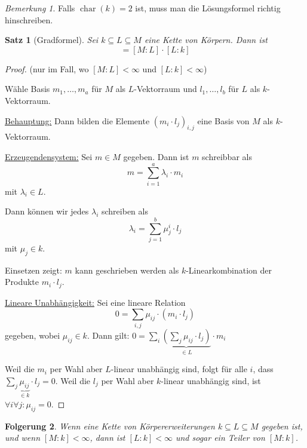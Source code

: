 \documentclass[a4paper,12pt,numbers=noenddot,parskip=full]{scrartcl}
\newcommand{\heading}{\underline}
\DeclareMathOperator{\charac}{char}
\theoremstyle{dotless}
\newtheorem{theorem}{Satz}[section]
\newtheorem{corollary}[theorem]{Folgerung}
\theoremstyle{remark}
\newtheorem*{remark}{Bemerkung}
\begin{document}
	\begin{remark}
		Falls $\charac(k) = 2$ ist, muss man die Lösungsformel richtig hinschreiben.
	\end{remark}

	\begin{theorem}[Gradformel]
		Sei $k \subseteq L \subseteq M$ eine Kette von Körpern. Dann ist
		\begin{equation*}
			[M:k] = [M:L] \cdot [L:k]
		\end{equation*}
	\end{theorem}

	\begin{proof}(nur im Fall, wo $[M:L] < \infty$ und $[L:k] < \infty$)

		Wähle Basis $m_1, \dots, m_a$ für $M$ als $L$-Vektorraum und $l_1, \dots, l_b$ für $L$ als $k$-Vektorraum.
		
		\heading{Behauptung:} Dann bilden die Elemente $(m_i \cdot l_j)_{i,j}$ eine Basis von $M$ als $k$-Vektorraum.
		
		\heading{Erzeugendensystem:} Sei $m \in M$ gegeben. Dann ist $m$ schreibbar als 
		\begin{equation*}
			m = \sum_{i = 1}^{a} \lambda_i \cdot m_i
		\end{equation*}
		mit $\lambda_i \in L$.
		
		Dann können wir jedes $\lambda_i$ schreiben als
		\begin{equation*}
			\lambda_i = \sum_{j = 1}^{b} \mu_j^i \cdot l_j
		\end{equation*}
		mit $\mu_j \in k$.
		
		Einsetzen zeigt: $m$ kann geschrieben werden als $k$-Linearkombination der Produkte $m_i \cdot l_j$.
		
		\heading{Lineare Unabhängigkeit:} Sei eine lineare Relation
		\begin{equation*}
			0 = \sum_{i,j} \mu_{ij} \cdot (m_i \cdot l_j)
		\end{equation*}
		gegeben, wobei $\mu_{ij} \in k$. Dann gilt: 
		$
			0 = \sum_{i} \underbrace{\left( \sum_{j} \mu_{ij} \cdot l_j \right)}_{\in L} \cdot m_i
		$
		
		Weil die $m_i$ per Wahl aber $L$-linear unabhängig sind, folgt für alle $i$, dass $\sum_{j} \underbrace{\mu_{ij}}_{\in k} \cdot l_j = 0$.
		Weil die $l_j$ per Wahl aber $k$-linear unabhängig sind, ist $\forall i \forall j: \mu_{ij} = 0$.
	\end{proof}

	\begin{corollary}
		Wenn eine Kette von Körpererweiterungen $k \subseteq L \subseteq M$ gegeben ist, und wenn $[M:k] < \infty$, dann ist $[L:k] < \infty$ und sogar ein Teiler von $[M:k]$.
	\end{corollary}
\end{document}

